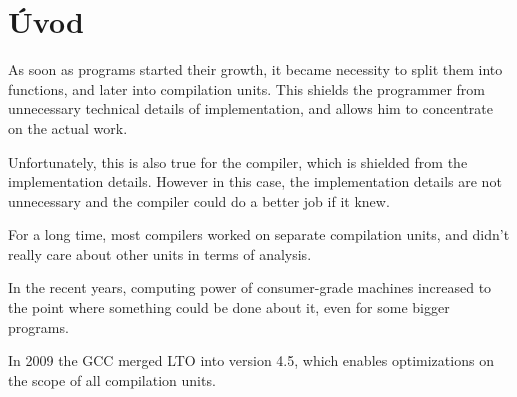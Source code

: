 \chapter*{Úvod}

%
%
%
%

As soon as programs started their growth, it became necessity to split them into
functions, and later into compilation units. This shields the programmer from
unnecessary technical details of implementation, and allows him to concentrate on
the actual work.

Unfortunately, this is also true for the compiler, which is shielded from the
implementation details. However in this case, the implementation details are not
unnecessary and the compiler could do a better job if it knew.

For a long time, most compilers worked on separate compilation units, and didn't
really care about other units in terms of analysis.

In the recent years, computing power of consumer-grade machines increased to the
point where something could be done about it, even for some bigger programs.

In 2009 the GCC merged LTO into version 4.5, which enables optimizations on the
scope of all compilation units.








